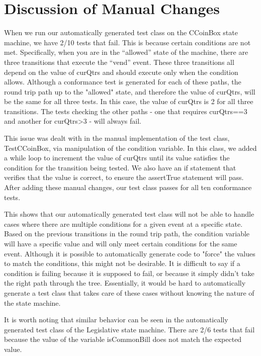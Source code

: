 \documentclass[11pt, a4paper]{article}
\begin{document}
\section{Discussion of Manual Changes}
When we run our automatically generated test class on the CCoinBox state machine, we have 2/10 tests that fail. This is because certain conditions are not met. Specifically, when you are in the “allowed” state of the machine, there are three transitions that execute the “vend” event. These three transitions all depend on the value of curQtrs and should execute only when the condition allows. Although a conformance test is generated for each of these paths, the round trip path up to the "allowed" state, and therefore the value of curQtrs, will be the same for all three tests. In this case, the value of curQtrs is 2 for all three transitions. The tests checking the other paths - one that requires curQtrs==3 and another for curQtrs>3 - will always fail. 

This issue was dealt with in the manual implementation of the test class, TestCCoinBox, via manipulation of the condition variable. In this class, we added a while loop to increment the value of curQtrs until its value satisfies the condition for the transition being tested. We also have an if statement that verifies that the value is correct, to ensure the assertTrue statement will pass. After adding these manual changes, our test class passes for all ten conformance tests. %

This shows that our automatically generated test class will not be able to handle cases where there are multiple conditions for a given event at a specific state. Based on the previous transitions in the round trip path, the condition variable will have a specific value and will only meet certain conditions for the same event. Although it is possible to automatically generate code to "force" the values to match the conditions, this might not be desirable. It is difficult to say if a condition is failing because it is supposed to fail, or because it simply didn't take the right path through the tree. Essentially, it would be hard to automatically generate a test class that takes care of these cases without knowing the nature of the state machine. 

It is worth noting that similar behavior can be seen in the automatically generated test class of the Legislative state machine. There are 2/6 tests that fail because the value of the variable isCommonBill does not match the expected value.
\end{document}
